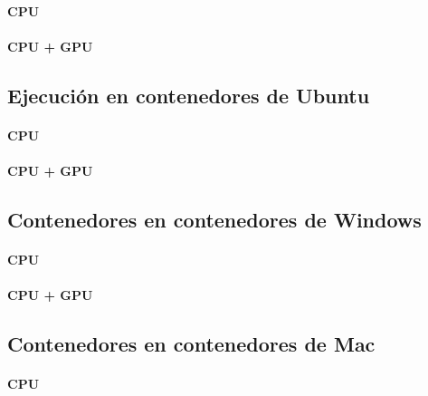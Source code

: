 \paragraph{CPU}

\paragraph{CPU + GPU}

\subsection{Ejecución en contenedores de Ubuntu}
\paragraph{CPU}

\paragraph{CPU + GPU}

\subsection{Contenedores en contenedores de Windows}
\paragraph{CPU}

\paragraph{CPU + GPU}

\subsection{Contenedores en contenedores de Mac}
\paragraph{CPU}

